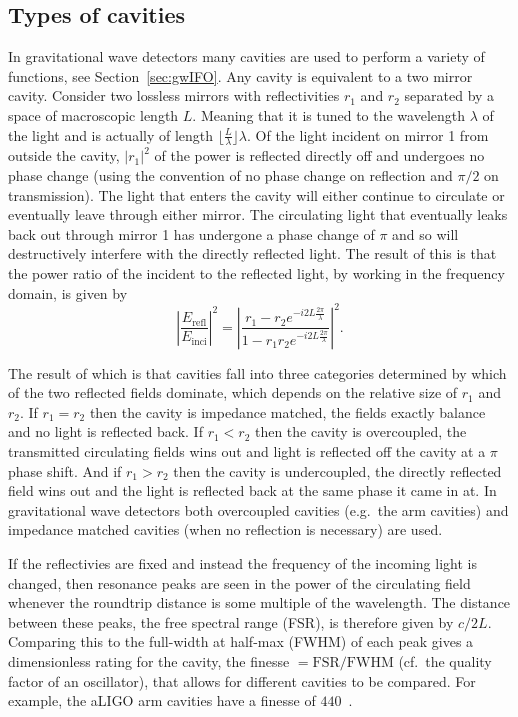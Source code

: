 \documentclass[aps,pra,superscriptaddress,reprint,nofootinbib]{revtex4-1}
\newcommand{\abs}[1]{\left\lvert #1 \right\rvert}
\begin{document}
\subsection{Types of cavities}

In gravitational wave detectors many cavities are used to perform a variety of functions, see Section~\ref{sec:gwIFO}. Any cavity is equivalent to a two mirror cavity. Consider two lossless mirrors with reflectivities $r_1$ and $r_2$ separated by a space of macroscopic length $L$. Meaning that it is tuned to the wavelength $\lambda$ of the light and is actually of length $\lfloor \frac{L}{\lambda} \rfloor \lambda$. Of the light incident on mirror 1 from outside the cavity, $\abs{r_1}^2$ of the power is reflected directly off and undergoes no phase change (using the convention of no phase change on reflection and $\pi/2$ on transmission). The light that enters the cavity will either continue to circulate or eventually leave through either mirror. The circulating light that eventually leaks back out through mirror 1 has undergone a phase change of $\pi$ and so will destructively interfere with the directly reflected light. The result of this is that the power ratio of the incident to the reflected light, by working in the frequency domain, is given by~\cite{Danilishin_2012}
$$\abs{\frac{E_{\mathrm{refl}}}{E_{\mathrm{inci}}}}^2 = \abs{\frac{r_1 - r_2 e^{-i 2 L \frac{2\pi}{\lambda}}}{1- r_1 r_2 e^{-i 2 L \frac{2\pi}{\lambda}}}}^2.$$ 

The result of which is that cavities fall into three categories determined by which of the two reflected fields dominate, which depends on the relative size of $r_1$ and $r_2$. If $r_1 = r_2$ then the cavity is impedance matched, the fields exactly balance and no light is reflected back. If $r_1 < r_2$ then the cavity is overcoupled, the transmitted circulating fields wins out and light is reflected off the cavity at a $\pi$ phase shift. And if $r_1 > r_2$ then the cavity is undercoupled, the directly reflected field wins out and the light is reflected back at the same phase it came in at. In gravitational wave detectors both overcoupled cavities (e.g.\ the arm cavities) and impedance matched cavities (when no reflection is necessary) are used.


If the reflectivies are fixed and instead the frequency of the incoming light is changed, then resonance peaks are seen in the power of the circulating field whenever the roundtrip distance is some multiple of the wavelength. The distance between these peaks, the free spectral range (FSR), is therefore given by $c/{2L}$. Comparing this to the full-width at half-max (FWHM) of each peak gives a dimensionless rating for the cavity, the finesse $= \mathrm{FSR}/\mathrm{FWHM}$ (cf.\ the quality factor of an oscillator), that allows for different cavities to be compared. For example, the aLIGO arm cavities have a finesse of $440$~\cite{AdvancedLIGO:2015}.
\end{document}
